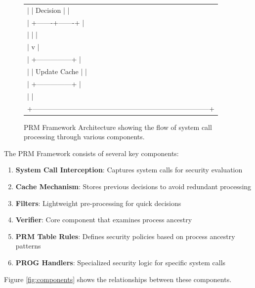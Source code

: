 \documentclass[conference]{IEEEtran}
\begin{document}
\begin{figure}[htbp]
{{{\begin{tabular}{l}
|             |   Decision    |                                               | \\
|             +-------+-------+                                               | \\
|                     |                                                       | \\
|                     v                                                       | \\
|             +---------------+                                               | \\
|             | Update Cache  |                                               | \\
|             +---------------+                                               | \\
|                                                                             | \\
+-----------------------------------------------------------------------------+ \\
\end{tabular}
}
}}
\caption{PRM Framework Architecture showing the flow of system call processing through various components.}
\label{fig:architecture}
\end{figure}

The PRM Framework consists of several key components:

\begin{enumerate}
\item \textbf{System Call Interception}: Captures system calls for security evaluation
\item \textbf{Cache Mechanism}: Stores previous decisions to avoid redundant processing
\item \textbf{Filters}: Lightweight pre-processing for quick decisions
\item \textbf{Verifier}: Core component that examines process ancestry
\item \textbf{PRM Table Rules}: Defines security policies based on process ancestry patterns
\item \textbf{PROG Handlers}: Specialized security logic for specific system calls
\end{enumerate}

Figure \ref{fig:components} shows the relationships between these components.
\end{document}
